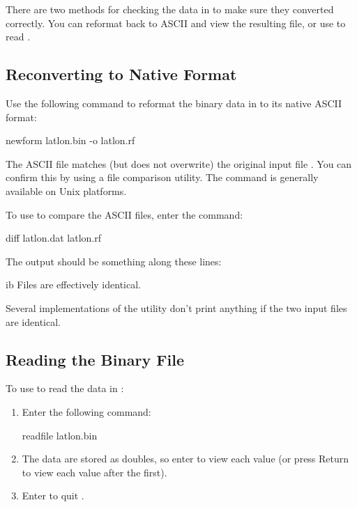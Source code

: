 There are two methods for checking the data in  to
make sure they converted correctly. You can reformat back to ASCII and
view the resulting file, or use  to read
.

\subsection{Reconverting to Native Format}

Use the following  command to reformat the binary data in
 to its native ASCII format:

\begin{example}
newform latlon.bin -o latlon.rf 
\end{example}

The ASCII file  matches (but does not overwrite) the
original input file . You can confirm this by using a
file comparison utility. The  command is generally available on
Unix platforms.

To use  to compare the  ASCII files, enter the
command:

\begin{example}
diff latlon.dat latlon.rf 
\end{example}

The output should be something along these lines: 

\begin{vcode}{ib}
Files are effectively identical. 
\end{vcode}

Several implementations of the  utility don't print anything
if the two input files are identical.


\subsection{Reading the Binary File}

To use  to read the data in : 

\begin{enumerate}
\item Enter the following command: 

\begin{example}
readfile latlon.bin 
\end{example}

\item The data are stored as doubles, so enter  to view each
value (or press Return to view each value after the first).

\item Enter  to quit . 
\end{enumerate}

